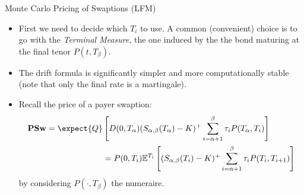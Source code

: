 \documentclass{beamer}
\begin{document}
\begin{frame}{Monte Carlo Pricing of Swaptions (LFM)}
	\begin{itemize}
		\item First we need to decide which $T_i$ to use. A common (convenient) choice is to go with the \emph{Terminal Measure}, the one induced by the the bond maturing at the final tenor $P(t, T_\beta)$.
		\item The drift formula is significantly simpler and more computationally stable (note that only the final rate is a martingale).
		\item Recall the price of a payer swaption:
		\begin{equation*}
			\begin{aligned}
				\textbf{PSw} = \expect{Q}&\left[D(0, T_\alpha) (S_{\alpha,\beta}(T_\alpha) - K)^+ \sum_{i=\alpha+1}^\beta \tau_i P(T_\alpha, T_i)\right] \\
				&= P(0, T_i)\mathbb{E}^{T_i}\left[(S_{\alpha, \beta}(T_i) - K)^+ \sum^\beta_{i=\alpha+1} \tau_i P(T_i, T_{i+1})\right]
			\end{aligned}
		\end{equation*}
		by considering $P(\cdot, T_\beta)$ the numeraire.
	\end{itemize}
\end{frame}
\end{document}
